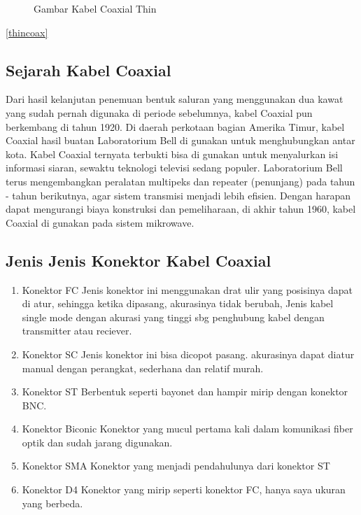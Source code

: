 \begin{itemize}
\begin{figure} [ht]
	\caption{Gambar Kabel Coaxial Thin}
	\label{thickcoax}
\end{figure}

\ref{thincoax}

\subsection{Sejarah Kabel Coaxial}
	Dari hasil kelanjutan penemuan bentuk saluran yang menggunakan dua kawat yang sudah pernah digunaka di periode sebelumnya, kabel Coaxial pun berkembang di tahun 1920. Di daerah perkotaan bagian Amerika Timur, kabel Coaxial hasil buatan Laboratorium Bell di gunakan untuk menghubungkan antar kota. Kabel Coaxial ternyata terbukti bisa di gunakan untuk menyalurkan isi informasi siaran, sewaktu teknologi televisi sedang populer. Laboratorium Bell terus mengembangkan peralatan multipeks dan repeater (penunjang) pada tahun - tahun berikutnya, agar sistem transmisi menjadi lebih efisien. Dengan harapan dapat mengurangi biaya konstruksi dan pemeliharaan, di akhir tahun 1960, kabel Coaxial di gunakan pada sistem mikrowave.
	
\subsection{Jenis Jenis Konektor Kabel Coaxial}
		\begin{enumerate}
			\item Konektor FC
			Jenis konektor ini menggunakan drat ulir yang posisinya dapat di atur, sehingga ketika dipasang, akurasinya tidak berubah, Jenis kabel single mode dengan akurasi yang tinggi sbg penghubung kabel dengan transmitter atau reciever.
			\item Konektor SC
			Jenis konektor ini bisa dicopot pasang. akurasinya dapat diatur manual dengan perangkat, sederhana dan relatif murah.
			\item Konektor ST
			Berbentuk seperti bayonet dan hampir mirip dengan konektor BNC.
			\item Konektor Biconic
			Konektor yang mucul pertama kali dalam komunikasi fiber optik dan sudah jarang digunakan.
			\item Konektor SMA
			Konektor yang menjadi pendahulunya dari konektor ST
			\item Konektor D4
			Konektor yang mirip seperti konektor FC, hanya saya ukuran yang berbeda.
			

\end{enumerate}
\end{itemize}
